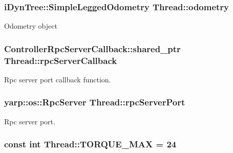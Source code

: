 \hypertarget{classThread_a23a41c6ccd1df898084112cfd46120f3}{
\subsubsection[{odometry}]{\setlength{\rightskip}{0pt plus 5cm}i\-Dyn\-Tree\-::\-Simple\-Legged\-Odometry {\bf \-Thread\-::odometry}}}\label{classThread_a23a41c6ccd1df898084112cfd46120f3}
\-Odometry object \hypertarget{classThread_a602de8d12886c9c57b5420c83804a38b}{
\subsubsection[{rpc\-Server\-Callback}]{\setlength{\rightskip}{0pt plus 5cm}\-Controller\-Rpc\-Server\-Callback\-::shared\-\_\-ptr {\bf \-Thread\-::rpc\-Server\-Callback}}}\label{classThread_a602de8d12886c9c57b5420c83804a38b}
\-Rpc server port callback function. \hypertarget{classThread_adbec1b4f2c8fc40641df6f118e93fd25}{
\subsubsection[{rpc\-Server\-Port}]{\setlength{\rightskip}{0pt plus 5cm}yarp\-::os\-::\-Rpc\-Server {\bf \-Thread\-::rpc\-Server\-Port}}}\label{classThread_adbec1b4f2c8fc40641df6f118e93fd25}
\-Rpc server port. \hypertarget{classThread_a5e864394c4bd0fbdf3cba7f6f825e17d}{
\subsubsection[{\-T\-O\-R\-Q\-U\-E\-\_\-\-M\-A\-X}]{\setlength{\rightskip}{0pt plus 5cm}const int {\bf \-Thread\-::\-T\-O\-R\-Q\-U\-E\-\_\-\-M\-A\-X} = 24}}\label{classThread_a5e864394c4bd0fbdf3cba7f6f825e17d}
